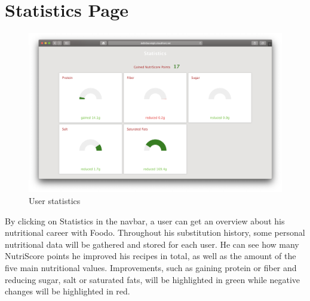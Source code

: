 \section*{Statistics Page}
\vspace{-2em}
\begin{figure}[H]
	\captionsetup{justification=centering}
	\begin{center}
		\includegraphics[scale=0.25]{Ressourcen/img/screenshots/screenshotQ.png}
		\vspace{-3em}
		\caption{User statistics}
	\end{center}
\end{figure}
By clicking on Statistics in the navbar, a user can get an overview about his nutritional career with Foodo. Throughout his substitution history, some personal nutritional data will be gathered and stored for each user. He can see how many NutriScore points he improved his recipes in total, as well as the amount of the five main nutritional values. Improvements, such as gaining protein or fiber and reducing sugar, salt or saturated fats, will be highlighted in green while negative changes will be highlighted in red.

